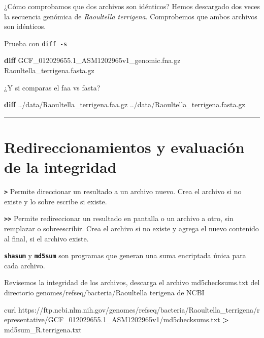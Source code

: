 \documentclass[
]{book}
\newenvironment{Shaded}{\begin{snugshade}}{\end{snugshade}}
\newcommand{\ExtensionTok}[1]{#1}
\newcommand{\FunctionTok}[1]{\textcolor[rgb]{0.13,0.29,0.53}{\textbf{#1}}}
\newcommand{\NormalTok}[1]{#1}
\newcommand{\OperatorTok}[1]{\textcolor[rgb]{0.81,0.36,0.00}{\textbf{#1}}}
\begin{document}
¿Cómo comprobamos que dos archivos son idénticos? Hemos descargado dos veces la secuencia genómica de \emph{Raoultella terrigena}. Comprobemos que ambos archivos son idénticos.

Prueba con \texttt{diff\ -s}

\begin{Shaded}
\begin{Highlighting}[]
\FunctionTok{diff}\NormalTok{ GCF\_012029655.1\_ASM1202965v1\_genomic.fna.gz Raoultella\_terrigena.fasta.gz}
\end{Highlighting}
\end{Shaded}

¿Y si comparas el faa vs fasta?

\begin{Shaded}
\begin{Highlighting}[]
\FunctionTok{diff}\NormalTok{ ../data/Raoultella\_terrigena.faa.gz ../data/Raoultella\_terrigena.fasta.gz}
\end{Highlighting}
\end{Shaded}

\begin{center}\rule{0.5\linewidth}{0.5pt}\end{center}

\section{Redireccionamientos y evaluación de la integridad}\label{redireccionamientos-y-evaluaciuxf3n-de-la-integridad}

\textbf{\texttt{\textgreater{}}} Permite direccionar un resultado a un archivo nuevo. Crea el archivo si no existe y lo sobre escribe si existe.

\textbf{\texttt{\textgreater{}\textgreater{}}} Permite redireccionar un resultado en pantalla o un archivo a otro, sin remplazar o sobreescribir. Crea el archivo si no existe y agrega el nuevo contenido al final, si el archivo existe.

\textbf{\texttt{shasum}} y \textbf{\texttt{md5sum}} son programas que generan una suma encriptada única para cada
archivo.

Revisemos la integridad de los archivos, descarga el archivo md5checksums.txt del directorio genomes/refseq/bacteria/Raoultella terigena de NCBI

\begin{Shaded}
\begin{Highlighting}[]
\ExtensionTok{curl}
\ExtensionTok{https://ftp.ncbi.nlm.nih.gov/genomes/refseq/bacteria/Raoultella\_terrigena/r}
\ExtensionTok{epresentative/GCF\_012029655.1\_ASM1202965v1/md5checksums.txt} \OperatorTok{\textgreater{}}
\ExtensionTok{md5sum\_R.terrigena.txt}
\end{Highlighting}
\end{Shaded}
\end{document}
